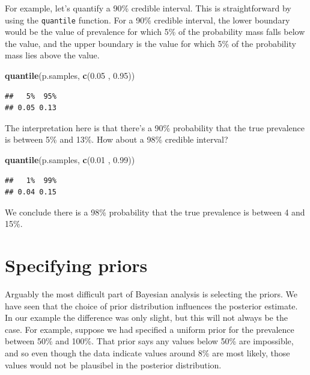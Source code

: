 \documentclass[
]{book}
\newenvironment{Shaded}{\begin{snugshade}}{\end{snugshade}}
\newcommand{\FloatTok}[1]{\textcolor[rgb]{0.00,0.00,0.81}{#1}}
\newcommand{\FunctionTok}[1]{\textcolor[rgb]{0.13,0.29,0.53}{\textbf{#1}}}
\newcommand{\NormalTok}[1]{#1}
\begin{document}
For example, let's quantify a 90\% credible interval. This is straightforward by using the \texttt{quantile} function. For a 90\% credible interval, the lower boundary would be the value of prevalence for which 5\% of the probability mass falls below the value, and the upper boundary is the value for which 5\% of the probability mass lies above the value.

\begin{Shaded}
\begin{Highlighting}[]
\FunctionTok{quantile}\NormalTok{(p.samples, }\FunctionTok{c}\NormalTok{(}\FloatTok{0.05}\NormalTok{ , }\FloatTok{0.95}\NormalTok{))}
\end{Highlighting}
\end{Shaded}

\begin{verbatim}
##   5%  95% 
## 0.05 0.13
\end{verbatim}

The interpretation here is that there's a 90\% probability that the true prevalence is between 5\% and 13\%. How about a 98\% credible interval?

\begin{Shaded}
\begin{Highlighting}[]
\FunctionTok{quantile}\NormalTok{(p.samples, }\FunctionTok{c}\NormalTok{(}\FloatTok{0.01}\NormalTok{ , }\FloatTok{0.99}\NormalTok{))}
\end{Highlighting}
\end{Shaded}

\begin{verbatim}
##   1%  99% 
## 0.04 0.15
\end{verbatim}

We conclude there is a 98\% probability that the true prevalence is between 4 and 15\%.

\section{Specifying priors}\label{specifying-priors}

Arguably the most difficult part of Bayesian analysis is selecting the priors. We have seen that the choice of prior distribution influences the posterior estimate. In our example the difference was only slight, but this will not always be the case. For example, suppose we had specified a uniform prior for the prevalence between 50\% and 100\%. That prior says any values below 50\% are impossible, and so even though the data indicate values around 8\% are most likely, those values would not be plausibel in the posterior distribution.
\end{document}
